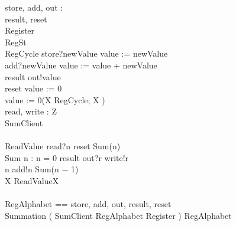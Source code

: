\documentclass{llncs}
\begin{document}
\begin{circus}
\circchannel store, add, out : \nat\\
\circchannel result, reset\\
\circprocess Register \circdef\\
	\circbegin \circstate RegSt \\
	RegCycle \circdef store?newValue \then value := newValue\\
	\extchoice add?newValue \then value := value + newValue\\
	\extchoice result \then out!value \then \Skip\\
	\extchoice reset \then value := 0\\
	\circspot value := 0\circseq (\circmu X \circspot RegCycle; X )
	\circend\\

\circchannel read, write : Z\\
\circprocess SumClient \circdef\\
	\circbegin\\
	ReadValue \circdef read?n \then reset \then Sum(n)\\
	Sum \circdef n : \nat \circspot \lcircguard n = 0 \rcircguard \circguard result \then out?r \then write!r \then \Skip\\
	\extchoice \lcircguard n  \rcircguard \circguard add!n \then Sum(n − 1)\\
	\circspot \circmu X \circspot ReadValue\circseq X\\
	\circend\\

\circchannelset RegAlphabet == \lchanset store, add, out, result, reset \rchanset\\
\circprocess Summation \circdef ( SumClient \lpar RegAlphabet \rpar Register ) \circhide RegAlphabet
\end{circus}
\end{document}
